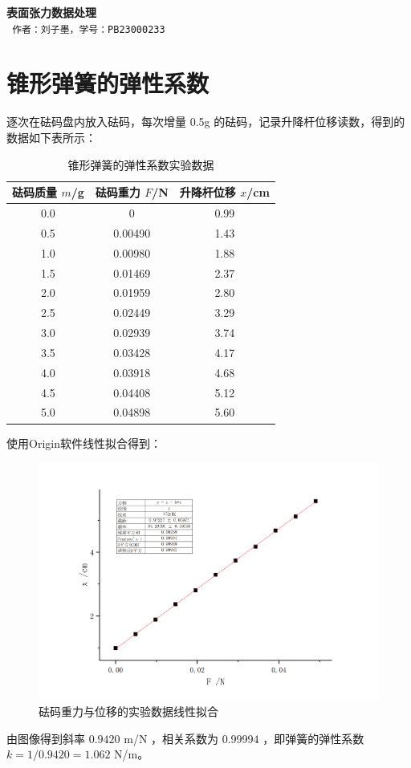 \documentclass[a4paper]{extarticle}
\begin{document}
    \begin{center}
        \textbf{\fontsize{22pt}{\baselineskip} \selectfont 表面张力数据处理}\\
        \vspace{2em}
        \texttt{\fontsize{14pt}{\baselineskip} \selectfont 作者：刘子墨，学号：PB23000233}\\
    \end{center}
    \section{锥形弹簧的弹性系数}
    逐次在砝码盘内放入砝码，每次增量 0.5g 的砝码，记录升降杆位移读数，得到的数据如下表所示：
    \begin{table}[H]
        \centering
        \caption{锥形弹簧的弹性系数实验数据}
        \begin{tabular}{ccc}
            \toprule
            砝码质量 $m$/g & 砝码重力 $F$/N & 升降杆位移 $x$/cm\\
            \midrule
            0.0 & 0 & 0.99\\
            0.5 & 0.00490 & 1.43\\
            1.0 & 0.00980 & 1.88\\
            1.5 & 0.01469 & 2.37\\
            2.0 & 0.01959 & 2.80\\
            2.5 & 0.02449 & 3.29\\
            3.0 & 0.02939 & 3.74\\
            3.5 & 0.03428 & 4.17\\
            4.0 & 0.03918 & 4.68\\
            4.5 & 0.04408 & 5.12\\
            5.0 & 0.04898 & 5.60\\
            \bottomrule
        \end{tabular}
    \end{table}
    使用Origin软件线性拟合得到：
    \begin{figure}[H]
        \centering
        \includegraphics[width=0.8\linewidth]{1.png}
        \caption{砝码重力与位移的实验数据线性拟合}
    \end{figure}
    由图像得到斜率 $0.9420$ m/N ，相关系数为 0.99994 ，即弹簧的弹性系数 $k = 1/0.9420=1.062$ N/m。
\end{document}
